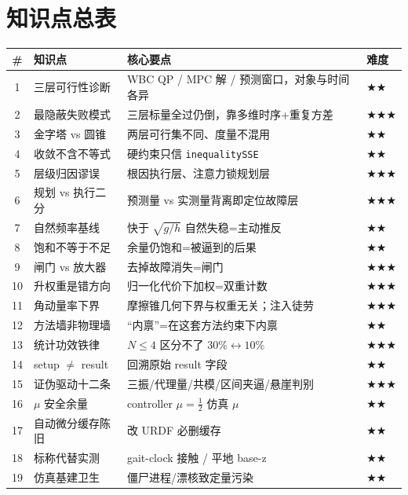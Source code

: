 \section*{知识点总表}
\begin{table}[H]\centering\small
\begin{tabular}{clll}
\toprule
\# & 知识点 & 核心要点 & 难度 \\
\midrule
1 & 三层可行性诊断 & WBC QP / MPC 解 / 预测窗口，对象与时间各异 & \(\bigstar\bigstar\) \\
2 & 最隐蔽失败模式 & 三层标量全过仍倒，靠多维时序+重复方差 & \(\bigstar\bigstar\bigstar\) \\
3 & 金字塔 vs 圆锥 & 两层可行集不同、度量不混用 & \(\bigstar\bigstar\) \\
4 & 收敛不含不等式 & 硬约束只信 \texttt{inequalitySSE} & \(\bigstar\bigstar\) \\
5 & 层级归因谬误 & 根因执行层、注意力锁规划层 & \(\bigstar\bigstar\bigstar\) \\
6 & 规划 vs 执行二分 & 预测量 vs 实测量背离即定位故障层 & \(\bigstar\bigstar\bigstar\) \\
7 & 自然频率基线 & 快于 $\sqrt{g/h}$ 自然失稳=主动推反 & \(\bigstar\bigstar\) \\
8 & 饱和不等于不足 & 余量仍饱和=被逼到的后果 & \(\bigstar\bigstar\) \\
9 & 闸门 vs 放大器 & 去掉故障消失=闸门 & \(\bigstar\bigstar\bigstar\) \\
10 & 升权重是错方向 & 归一化代价下加权=双重计数 & \(\bigstar\bigstar\bigstar\) \\
11 & 角动量率下界 & 摩擦锥几何下界与权重无关；注入徒劳 & \(\bigstar\bigstar\bigstar\) \\
12 & 方法墙非物理墙 & “内禀”=在这套方法约束下内禀 & \(\bigstar\bigstar\) \\
13 & 统计功效铁律 & $N\le 4$ 区分不了 $30\%{\leftrightarrow}10\%$ & \(\bigstar\bigstar\bigstar\) \\
14 & setup $\ne$ result & 回溯原始 result 字段 & \(\bigstar\bigstar\) \\
15 & 证伪驱动十二条 & 三振/代理量/共模/区间夹逼/悬崖判别 & \(\bigstar\bigstar\bigstar\) \\
16 & $\mu$ 安全余量 & controller $\mu=\tfrac12$ 仿真 $\mu$ & \(\bigstar\bigstar\) \\
17 & 自动微分缓存陈旧 & 改 URDF 必删缓存 & \(\bigstar\bigstar\) \\
18 & 标称代替实测 & gait-clock 接触 / 平地 base-z & \(\bigstar\bigstar\) \\
19 & 仿真基建卫生 & 僵尸进程/漂核致定量污染 & \(\bigstar\bigstar\) \\
\bottomrule
\end{tabular}
\end{table}

